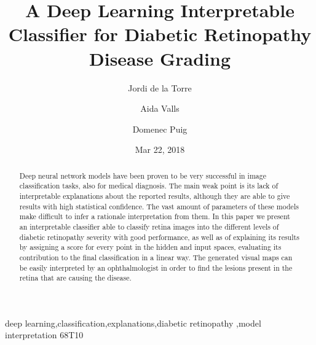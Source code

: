 \documentclass[review]{elsarticle}
\begin{document}
\begin{frontmatter}
	
	\title{A Deep Learning Interpretable Classifier for Diabetic Retinopathy Disease Grading}
	
	\author[rvt]{Jordi de la Torre}
	\author[rvt]{Aida Valls}
	\author[rvt]{Domenec Puig}
	
	
	\address[rvt]{Departament d'Enginyeria Inform\`atica i Matem\`atiques.\\Escola T\`ecnica Superior d'Enginyeria.\\Universitat Rovira i Virgili\\Avinguda Paisos Catalans, 26. E-43007\\
		Tarragona, Spain}
	
	\date{Mar 22, 2018}
	
	\begin{abstract}
		Deep neural network models have been proven to be very successful in image classification tasks, also for medical diagnosis. The main weak point is its lack of interpretable explanations about the reported results, although they are able to give results with high statistical confidence. The vast amount of parameters of these models make difficult to infer a rationale interpretation from them. In this paper we present an interpretable classifier able to classify retina images into the different levels of diabetic retinopathy severity with good performance, as well as of explaining its results by assigning a score for every point in the hidden and input spaces, evaluating its contribution to the final classification in a linear way. The generated visual maps can be easily interpreted by an ophthalmologist in order to find the lesions present in the retina that are causing the disease.
	\end{abstract}
	
	\begin{keyword}
		deep learning\sep classification\sep explanations\sep diabetic retinopathy \sep model interpretation
		\MSC[2010] 68T10
	\end{keyword}
	
\end{frontmatter}
\end{document}
